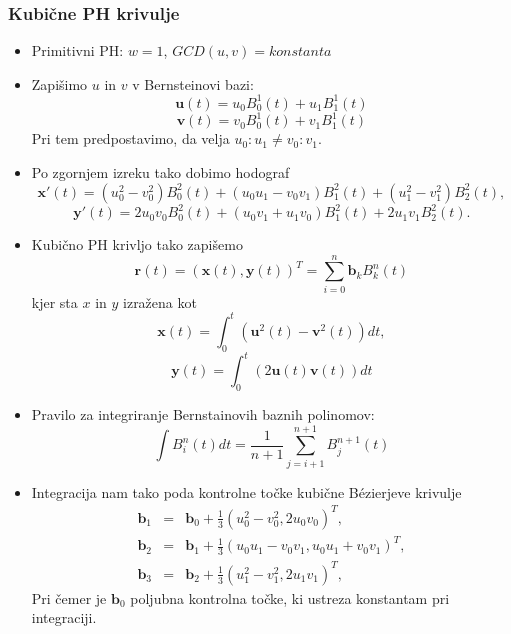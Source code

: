 \documentclass[12pt]{beamer}
\theoremstyle{definition} %
\theoremstyle{plain} %
\begin{document}
\begin{frame}
\frametitle{Kubične PH krivulje}
    \begin{itemize}
        \item Primitivni PH: $w=1$, $GCD(u, v) = konstanta$ %
        \item Zapišimo $u$ in $v$ v Bernsteinovi bazi:
              $$ \textbf{u}(t) = u_0 B_0^1(t) + u_1 B_1^1(t) $$
              $$ \textbf{v}(t) = v_0 B_0^1(t) + v_1 B_1^1(t) $$
              Pri tem predpostavimo, da velja $u_0 : u_1 \neq v_0 : v_1$.
        \item Po zgornjem izreku tako dobimo hodograf
              $$\textbf{x}'(t) = (u_0^2 - v_0^2)B_0^2(t) + (u_0 u_1 - v_0 v_1) B_1^2(t) + (u_1^2 - v_1^2) B_2^2(t),$$
              $$\textbf{y}'(t) = 2 u_0 v_0 B_0^2(t) + (u_0 v_1 + u_1 v_0) B_1^2(t) + 2 u_1 v_1 B_2^2(t).$$
    \end{itemize}
\end{frame}
\begin{frame}
    \begin{itemize}
        \item Kubično PH krivljo tako zapišemo 
              $$ \textbf{r}(t) = (\textbf{x}(t), \textbf{y}(t))^T = \sum_{i=0}^{n}{\textbf{b}_k B_k^n(t)} $$
              kjer sta $x$ in $y$ izražena kot
              $$\textbf{x}(t) = \int_0^t (\textbf{u}^2(t) - \textbf{v}^2(t)) dt,$$
              $$\textbf{y}(t) = \int_0^t (2\textbf{u}(t)\textbf{v}(t))dt$$
        \item Pravilo za integriranje Bernstainovih baznih polinomov:
              $$\int B^n_i(t) dt = \frac{1}{n+1} \sum_{j=i+1}^{n+1} B^{n+1}_j(t)$$
    \end{itemize}
\end{frame}

\begin{frame}
    \begin{itemize}
        \item Integracija nam tako poda kontrolne točke kubične B\'ezierjeve krivulje
                \begin{eqnarray}
                    \textbf{b}_1 &=& \textbf{b}_0 + \frac{1}{3}(u_0^2 - v_0^2, 2 u_0 v_0)^T,\nonumber\\
                    \textbf{b}_2 &=& \textbf{b}_1 + \frac{1}{3}(u_0 u_1 - v_0 v_1, u_0 u_1 + v_0 v_1)^T,\nonumber\\
                    \textbf{b}_3 &=& \textbf{b}_2 + \frac{1}{3} (u_1^2 - v_1^2, 2 u_1 v_1)^T,\nonumber
                \end{eqnarray}
              Pri čemer je $\textbf{b}_0$ poljubna kontrolna točke, ki ustreza konstantam pri integraciji.
    \end{itemize}
\end{frame}
\end{document}
